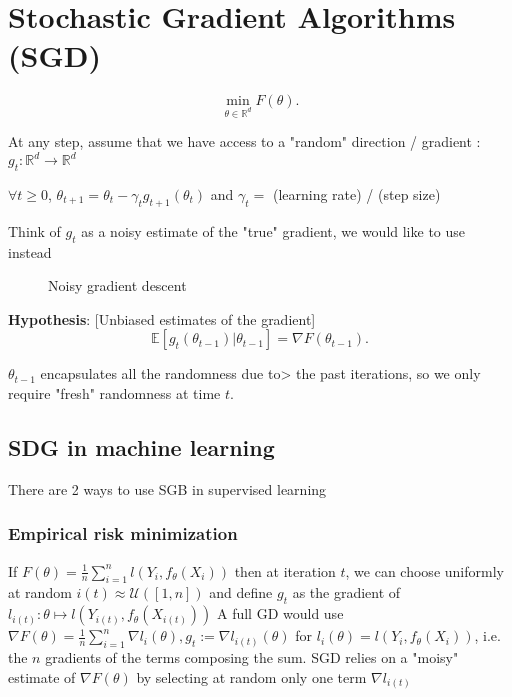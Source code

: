 \chapter{Stochastic Gradient Algorithms (SGD)}

\[
    \min _{\theta \in \mathbb{R}^d} F(\theta )
.\]

At any step, assume that we have access to a "random" direction / gradient : $ g_t : \mathbb{R}^d \to \mathbb{R}^d $ 


$ \forall t \geq 0 $, $ \theta_{t+1} = \theta_{t} - \gamma_t g_{t+1}(\theta_{t}) $ and $\gamma_t =$ (learning rate) / (step size)

Think of $ g_t $ as a noisy estimate of the "true" gradient, we would like to use instead 

\begin{figure}[htbp]
    \centering
    
    \caption{Noisy gradient descent}
\end{figure}

\textbf{Hypothesis}: [Unbiased estimates of the gradient]
\[
    \mathbb{E}[g_t(\theta _{t-1}) | \theta _{t-1}] = \nabla F(\theta _{t-1})
.\]

$\theta_{t-1}$ encapsulates all the randomness due to> the past iterations, so we only require "fresh" randomness at time $t$. \\

\section{SDG in machine learning}

There are 2 ways to use SGB in supervised learning 

\subsection{Empirical risk minimization}
If $F(\theta) = \frac{1}{n} \sum^n_{i=1}l(Y_i, f_\theta(X_i))$
then at iteration $ t $, we can choose uniformly at random $ i(t) \approx \mathcal{U} ( [1, n ]) $ 
and define $g_t$ as the gradient of $l_{i(t)} : \theta \mapsto l(Y_{i(t)}, f_{\theta}(X_{i(t)}))$
A full GD would use $ \nabla F(\theta ) = \frac{1}{n} \sum_{i=1}^{n} \nabla l_i (\theta ), g_t := \nabla l_{i(t)} (\theta ) $  for $ l_i (\theta ) = l(Y_i, f_\theta (X_i)) $, i.e. the $ n $ gradients of the terms composing the sum. SGD relies on a "moisy" estimate of $ \nabla F(\theta ) $ by selecting at random only one term $ \nabla l_{i(t)} $ 

